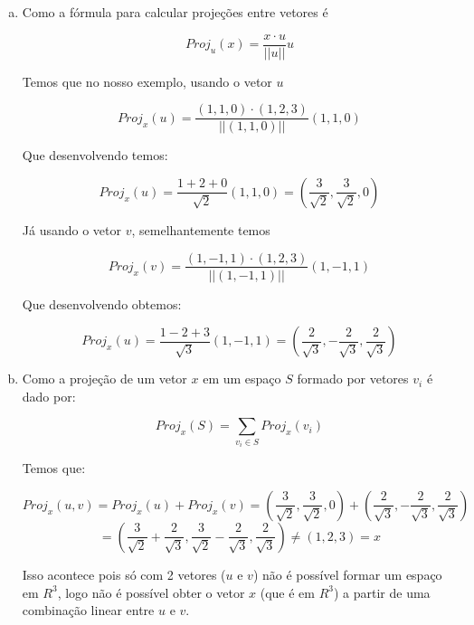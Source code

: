 \documentclass[11pt]{article}
\begin{document}
\begin{exerc}
\begin{enumerate}[a.]
.
\item
Como a fórmula para calcular projeções entre vetores é

$$Proj_u(x) = \frac{x \cdot u}{||u||} u$$

Temos que no nosso exemplo, usando o vetor $u$

$$Proj_x(u) = \frac{(1, 1, 0) \cdot (1, 2, 3)}{||(1, 1, 0)||} (1, 1, 0)$$

Que desenvolvendo temos:

$$Proj_x(u) = \frac{1 + 2 + 0}{\sqrt{2}} (1, 1, 0) = (\frac{3}{\sqrt{2}}, \frac{3}{\sqrt{2}}, 0)$$

Já usando o vetor $v$, semelhantemente temos

$$Proj_x(v) = \frac{(1, -1, 1) \cdot (1, 2, 3)}{||(1, -1, 1)||} (1, -1, 1)$$

Que desenvolvendo obtemos:

$$Proj_x(u) = \frac{1 - 2 + 3}{\sqrt{3}} (1, -1, 1) = (\frac{2}{\sqrt{3}}, -\frac{2}{\sqrt{3}}, \frac{2}{\sqrt{3}})$$

\item
Como a projeção de um vetor $x$ em um espaço $S$ formado por vetores $v_i$ é dado por:

$$Proj_x(S) = \sum_{v_i \in S} Proj_x(v_i)$$

Temos que:

$$Proj_x({u, v}) = Proj_x(u) + Proj_x(v) = (\frac{3}{\sqrt{2}}, \frac{3}{\sqrt{2}}, 0) + (\frac{2}{\sqrt{3}}, -\frac{2}{\sqrt{3}}, \frac{2}{\sqrt{3}})$$
$$ = (\frac{3}{\sqrt{2}} + \frac{2}{\sqrt{3}}, \frac{3}{\sqrt{2}} - \frac{2}{\sqrt{3}}, \frac{2}{\sqrt{3}}) \neq (1, 2, 3) = x$$

Isso acontece pois só com 2 vetores ($u$ e $v$) não é possível formar um espaço em $R^3$, logo não é possível obter o vetor $x$ (que é em $R^3$) a partir de uma combinação linear entre $u$ e $v$.

\end{enumerate}
\end{exerc}
\end{document}
